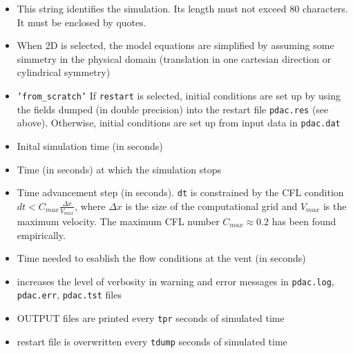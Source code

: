 \begin{itemize}
\item
{}
{This string identifies the simulation. Its length must not exceed 80 characters. It must be enclosed by quotes.}

\item
{}
{When 2D is selected, the model equations are simplified by assuming
some simmetry in the physical domain (translation in one cartesian 
direction or cylindrical symmetry)}

\item
{}
{{\tt 'from\_scratch'}}
{If {\tt restart} is selected, initial conditions are set up by using the fields
dumped (in double precision) into the restart file {\tt pdac.res} (see above). 
Otherwise, initial conditions are set up from input data in {\tt pdac.dat}} 

\item
{}
{Inital simulation time (in seconds)}

\item
{}
{Time (in seconds) at which the simulation stops}

\item
{}
{Time advancement step (in seconds). 
{\tt dt} is constrained by the CFL condition
$dt < C_{max}\frac{\Delta x}{V_{max}}$, where $\Delta x$ is
the size of the computational grid and $V_{max}$ is the maximum
velocity. The maximum CFL number $C_{max}\approx 0.2$ has been 
found empirically.}

\item
{}
{Time needed to esablish the flow conditions at the vent (in seconds)}

\item
{}
{increases the level of verbosity in warning and error messages 
in {\tt pdac.log}, {\tt pdac.err}, {\tt pdac.tst} files}

\item
{}
{OUTPUT files are printed every {\tt tpr} seconds of simulated time}

\item
{}
{restart file is overwritten every {\tt tdump} seconds of simulated time}


\end{itemize}
